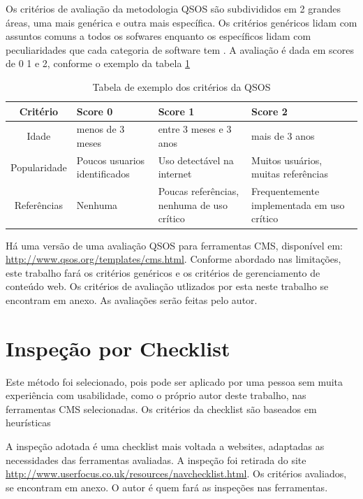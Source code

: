 Os critérios de avaliação da metodologia QSOS são subdivididos em 2 grandes áreas, uma mais genérica e outra mais específica. Os critérios genéricos lidam com assuntos comuns a todos os sofwares enquanto os específicos lidam com peculiaridades que cada categoria de software tem \cite{openbrr_qsos}. A avaliação é dada em scores de 0 1 e 2, conforme o exemplo da tabela \ref{table:qsos_avaliacao}  

\begin{table}[ht]
\caption{Tabela de exemplo dos critérios da QSOS } %
\centering %
\begin{tabular}{c | p{3cm} | p{4.2cm} | p{4cm}} %
\hline\hline %
Critério & Score 0 & Score 1 & Score 2  \\ [0.5ex] %
\hline %
Idade      & menos de 3 meses  & entre 3 meses e 3 anos   & mais de 3 anos    \\ \hline
Popularidade & Poucos usuarios identificados  & Uso detectável na internet & Muitos usuários, muitas referências    \\ \hline
Referências & Nenhuma   & Poucas referências, nenhuma de uso crítico  & Frequentemente implementada em uso crítico \\ [1ex] %
\hline %
\end{tabular}
\label{table:qsos_avaliacao} %
\end{table}

Há uma versão de uma avaliação QSOS para ferramentas CMS, disponível em: \url{http://www.qsos.org/templates/cms.html}. Conforme abordado nas limitações, este trabalho fará os critérios genéricos e os critérios de gerenciamento de conteúdo web. Os critérios de avaliação utlizados por esta neste trabalho se encontram em anexo. As avaliações serão feitas pelo autor.

\section{Inspeção por Checklist}

Este método foi selecionado, pois pode ser aplicado por uma pessoa sem muita experiência com usabilidade, como o próprio autor deste trabalho, nas ferramentas CMS selecionadas. Os critérios da checklist são baseados em heurísticas

A inspeção adotada é uma checklist mais voltada a websites, adaptadas as necessidades das ferramentas avaliadas. A inspeção foi retirada do site \url{http://www.userfocus.co.uk/resources/navchecklist.html}. Os critérios avaliados, se encontram em anexo. O autor é quem fará as inspeções nas ferramentas.


